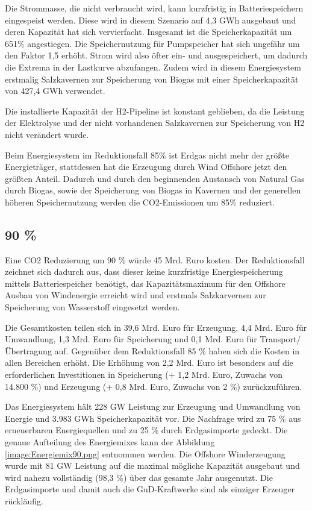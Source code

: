 Die Strommasse, die nicht verbraucht wird, kann kurzfristig in Batteriespeichern eingespeist werden. Diese wird in diesem Szenario auf 4,3 GWh ausgebaut und deren Kapazität hat sich vervierfacht.
\newline
Insgesamt ist die Speicherkapazität um 651\% angestiegen. Die Speichernutzung für Pumpspeicher hat sich ungefähr um den Faktor 1,5 erhöht. Strom wird also öfter ein- und ausgespeichert, um dadurch die Extrema in der Lastkurve abzufangen. Zudem wird in diesem Energiesystem erstmalig Salzkavernen zur Speicherung von Biogas mit einer Speicherkapazität von 427,4 GWh verwendet.

Die installierte Kapazität der H2-Pipeline ist konstant geblieben, da die Leistung der Elektrolyse und der nicht vorhandenen Salzkavernen zur Speicherung von H2 nicht verändert wurde.

Beim Energiesystem im Reduktionsfall 85\% ist Erdgas nicht mehr der größte Energieträger, stattdessen hat die Erzeugung durch Wind Offshore jetzt den größten Anteil.
Dadurch und durch den beginnenden Austausch von Natural Gas durch Biogas, sowie der Speicherung von Biogas in Kavernen und der generellen höheren Speichernutzung werden die CO2-Emissionen um 85\% reduziert.

\subsection{90 \%}
Eine CO2 Reduzierung um 90 \% würde 45 Mrd. Euro kosten. Der Reduktionsfall zeichnet sich dadurch aus, dass dieser keine kurzfristige Energiespeicherung mittels Batteriespeicher benötigt, das Kapazitätsmaximum für den Offshore Ausbau von Windenergie erreicht wird und erstmals Salzkarvernen zur Speicherung von Wasserstoff eingesetzt werden.

Die Gesamtkosten teilen sich in 39,6 Mrd. Euro für Erzeugung, 4,4 Mrd. Euro für Umwandlung, 1,3 Mrd. Euro für Speicherung und 0,1 Mrd. Euro für Transport/Übertragung auf. Gegenüber dem Reduktionsfall 85 \% haben sich die Kosten in allen Bereichen erhöht. Die Erhöhung von 2,2 Mrd. Euro ist besonders auf die erforderlichen Investitionen in Speicherung (+ 1,2 Mrd. Euro, Zuwachs von 14.800 \%) und Erzeugung (+ 0,8 Mrd. Euro, Zuwachs von 2 \%) zurückzuführen.

Das Energiesystem hält 228 GW Leistung zur Erzeugung und Umwandlung von Energie und 3.983 GWh Speicherkapazität vor. Die Nachfrage wird zu 75 \% aus erneuerbaren Energiequellen und zu 25 \% durch Erdgasimporte gedeckt. Die genaue Aufteilung des Energiemixes kann der Abbildung \ref{image:Energiemix90.png} entnommen werden. Die Offshore Winderzeugung wurde mit 81 GW Leistung auf die maximal mögliche Kapazität ausgebaut und wird nahezu vollständig (98,3 \%) über das gesamte Jahr ausgenutzt. 
Die Erdgasimporte und damit auch die GuD-Kraftwerke sind als einziger Erzeuger rückläufig.  

